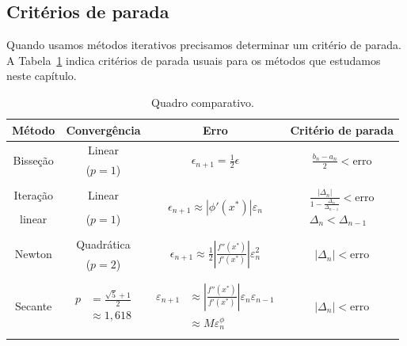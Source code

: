 \begin{ex}
\section{Critérios de parada}

Quando usamos métodos iterativos precisamos determinar um critério de parada. A Tabela~\ref{tab:quadro_comparativo} indica critérios de parada usuais para os métodos que estudamos neste capítulo.

\begin{table}[h!]
  \centering
  \caption{Quadro comparativo.}
  \label{tab:quadro_comparativo}
  {\small
  \begin{tabular}[h!]{cccc} \hline
    Método & Convergência & Erro & Critério de parada \\ \hline
    \multirow{2}{*}{Bisseção} & Linear & \multirow{2}{*}{$\displaystyle \epsilon_{n+1}=\frac{1}{2}\epsilon$} & \multirow{2}{*}{$\displaystyle \frac{b_n - a_n}{2} < \text{erro}$} \\
    & ($p=1$) & & \\
    & & & \\
    Iteração & Linear & \multirow{2}{*}{$\displaystyle \epsilon_{n+1}\approx |\phi'(x^*)| \varepsilon_{n}$} & \multirow{2}{*}{$\displaystyle \begin{array}{cc} \frac{|\Delta_n|}{1-\frac{\Delta_n}{\Delta_{n-1}}}< \text{erro} \\ \Delta_{n} < \Delta_{n-1}\end{array}$} \\
    linear                 & ($p=1$) & & \\
    & & & \\
    \multirow{2}{*}{Newton} & Quadrática & \multirow{2}{*}{$\displaystyle \epsilon_{n+1}\approx \frac{1}{2}\left|\frac{f''(x^*)}{f'(x^*)}\right|\varepsilon_{n}^2$} & \multirow{2}{*}{$|\Delta_n|< \text{erro}$} \\
    & ($p=2$) & & \\
    & & & \\
    \multirow{3}{*}{Secante} & \multirow{3}{*}{$\displaystyle \begin{array}{rl} p &= {\displaystyle \frac{\sqrt{5}+1}{2}}\\
  &\approx 1,618\end{array}$} & \multirow{3}{*}{$\displaystyle \begin{array}{rl} \varepsilon_{n+1} &\approx \displaystyle \left|\frac{f''(x^*)}{f'(x^*)}\right| \varepsilon_{n}\varepsilon_{n-1} \\
    &\approx M \varepsilon_{n}^\phi\end{array}$} & \multirow{3}{*}{$|\Delta_n|< \text{erro}$}\\
    & & & \\
    & & & \\
    & & & \\ \hline
  \end{tabular}
}
\end{table}



\end{ex}
